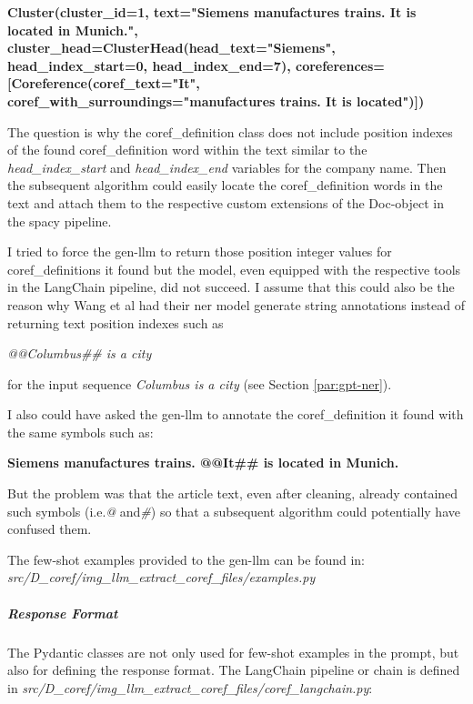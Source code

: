 \begin{center}
\scriptsize\textbf{{
Cluster(cluster\_id=1, text="Siemens manufactures trains. It is located in Munich.",\newline
        cluster\_head=ClusterHead(head\_text="Siemens", head\_index\_start=0, head\_index\_end=7),\newline
        coreferences=[Coreference(coref\_text="It", coref\_with\_surroundings="manufactures trains. It is located")])}}
\end{center}

The question is why the \gls{coref_definition} class does not include position indexes of the found \gls{coref_definition} word within the text similar to the \emph{head\_index\_start} and \emph{head\_index\_end} variables for the company name.
Then the subsequent algorithm could easily locate the \gls{coref_definition} words in the text and attach them to the respective custom extensions of the Doc-object in the spacy pipeline.

I tried to force the \gls{gen-llm} to return those position integer values for \glspl{coref_definition} it found but the model, even equipped with the respective tools in the LangChain pipeline, did not succeed.
I assume that this could also be the reason why Wang et al \cite{gptner} had their \gls{ner} model generate string annotations instead of returning text position indexes such as

\begin{center}
    \emph{@@Columbus\#\# is a city}
\end{center}
for the input sequence \emph{Columbus is a city} (see Section \ref{par:gpt-ner}).

I also could have asked the \gls{gen-llm} to annotate the \gls{coref_definition} it found with the same symbols such as:
\begin{center}
    \textbf{Siemens manufactures trains. @@It\#\# is located in Munich.}
\end{center}

But the problem was that the article text, even after cleaning, already contained such symbols (i.e.\emph{@} and\emph{\#}) so that a subsequent algorithm could potentially have confused them.

The few-shot examples provided to the \gls{gen-llm} can be found in: \newline
\emph{src/D\_coref/img\_llm\_extract\_coref\_files/examples.py}

\subparagraph{Response Format}
The Pydantic classes are not only used for few-shot examples in the \gls{prompt}, but also for defining the response format.
The LangChain pipeline or chain is defined in \newline
\emph{src/D\_coref/img\_llm\_extract\_coref\_files/coref\_langchain.py}:

